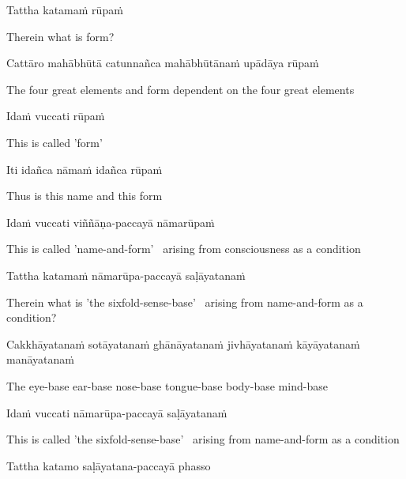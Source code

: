 Tattha katamaṁ rūpaṁ

\begin{english}
  Therein what is form?
\end{english}

Cattāro mahābhūtā catunnañca mahābhūtānaṁ upādāya rūpaṁ

\begin{english-hang}
  The four great elements and form dependent on the four great elements
\end{english-hang}

Idaṁ vuccati rūpaṁ

\begin{english}
  This is called 'form'
\end{english}

Iti idañca nāmaṁ idañca rūpaṁ

\begin{english}
  Thus is this name and this form
\end{english}

Idaṁ vuccati viññāṇa-paccayā nāmarūpaṁ

\begin{english-hang}
  This is called 'name-and-form' \breathmark\ arising from consciousness as a condition
\end{english-hang}

Tattha katamaṁ nāmarūpa-paccayā saḷāyatanaṁ

\begin{english-hang}
  Therein what is 'the sixfold-sense-base' \breathmark\ arising from name-and-form as a condition?
\end{english-hang}

\begin{pali-hang}
  Cakkhāyatanaṁ sotāyatanaṁ ghānāyatanaṁ jivhāyatanaṁ kāyāyatanaṁ manāyatanaṁ
\end{pali-hang}

\begin{english-hang}
  The eye-base ear-base nose-base tongue-base body-base mind-base
\end{english-hang}

Idaṁ vuccati nāmarūpa-paccayā saḷāyatanaṁ

\begin{english-hang}
  This is called 'the sixfold-sense-base' \breathmark\ arising from name-and-form as a condition
\end{english-hang}

Tattha katamo saḷāyatana-paccayā phasso

